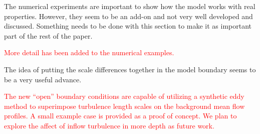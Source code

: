 \documentclass[12pt]{article}
\newcommand\hl[1]{\textcolor{red}{#1}}
\begin{document}
The numerical experiments are important to show how the model works with real properties.
However, they seem to be an add-on and not very well developed and discussed. Something
needs to be done with this section to make it as important part of the rest of the paper.

\hl{More detail has been added to the numerical examples.}

The idea of putting the scale differences together in the model boundary seems to be a very
useful advance.

\hl{The new ``open'' boundary conditions are capable of utilizing a synthetic eddy method to superimpose turbulence length scales on the background mean flow profiles.  A small example case is provided as a proof of concept.  We plan to explore the affect of inflow turbulence in more depth as future work.}
\end{document}
